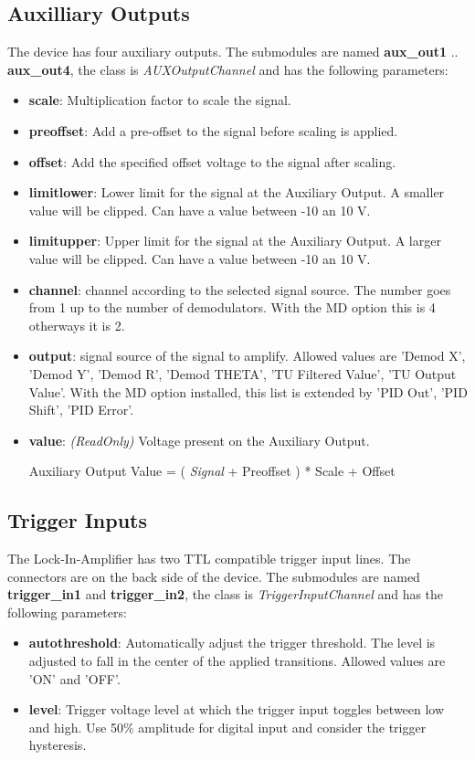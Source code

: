 \documentclass[11pt]{article} %
\begin{document}
\subsection{Auxilliary Outputs}
The device has four auxiliary outputs. The submodules are named {\bf aux\_out1} .. {\bf aux\_out4}, the class is {\it AUXOutputChannel} and has the following parameters:
\begin{itemize}
\item {\bf scale}: Multiplication factor to scale the signal.
\item {\bf preoffset}: Add a pre-offset to the signal before scaling is applied.
\item {\bf offset}: Add the specified offset voltage to the signal after scaling.
\item {\bf limitlower}: Lower limit for the signal at the Auxiliary Output. A smaller value will be clipped. Can have a value between -10 an 10 V.
\item {\bf limitupper}: Upper limit for the signal at the Auxiliary Output. A larger value will be clipped. Can have a value between -10 an 10 V.
\item {\bf channel}: channel according to the selected signal source. The number goes from 1 up to the number of demodulators. With the MD option this is 4 otherways it is 2.
\item {\bf output}: signal source of the signal to amplify. Allowed values are 'Demod X', 'Demod Y', 'Demod R', 'Demod THETA', 'TU Filtered Value', 'TU Output Value'. With the MD option installed, this list is extended by 'PID Out', 'PID Shift', 'PID Error'.
\item {\bf value}: {\it (ReadOnly)} Voltage present on the Auxiliary Output. \\
\centerline{Auxiliary Output Value = ( {\it Signal} + Preoffset ) * Scale + Offset}
\end{itemize}


\subsection{Trigger Inputs}
The Lock-In-Amplifier has two TTL compatible trigger input lines. The connectors are on the back side of the device. The submodules are named {\bf trigger\_in1} and {\bf trigger\_in2}, the class is {\it TriggerInputChannel} and has the following parameters:
\begin{itemize}
\item {\bf autothreshold}: Automatically adjust the trigger threshold. The level is adjusted to fall in the center of the applied transitions. Allowed values are 'ON' and 'OFF'.
\item {\bf level}: Trigger voltage level at which the trigger input toggles between low and high. Use 50\% amplitude for digital input and consider the trigger hysteresis.
\end{itemize}
\end{document}
